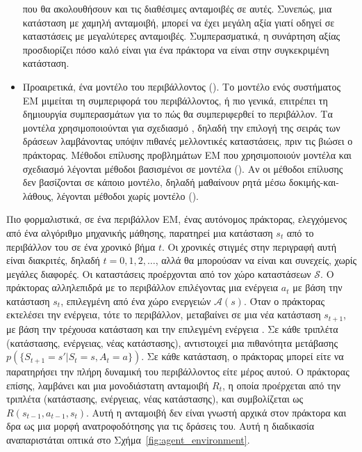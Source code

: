 \begin{itemize}
          που θα ακολουθήσουν και τις διαθέσιμες ανταμοιβές σε αυτές. Συνεπώς, μια κατάσταση
          με χαμηλή ανταμοιβή, μπορεί να έχει μεγάλη αξία γιατί οδηγεί σε καταστάσεις με μεγαλύτερες ανταμοιβές.
          Συμπερασματικά, η συνάρτηση αξίας προσδιορίζει πόσο καλό είναι για ένα πράκτορα να είναι στην συγκεκριμένη κατάσταση.
    \item Προαιρετικά, ένα μοντέλο του περιβάλλοντος (). Το μοντέλο ενός συστήματος ΕΜ μιμείται τη
          συμπεριφορά του περιβάλλοντος, ή πιο γενικά, επιτρέπει τη δημιουργία συμπερασμάτων για το πώς θα
          συμπεριφερθεί το περιβάλλον. Τα μοντέλα χρησιμοποιούνται για σχεδιασμό , δηλαδή την επιλογή της
          σειράς των δράσεων λαμβάνοντας υπόψιν πιθανές μελλοντικές καταστάσεις, πριν τις βιώσει ο πράκτορας.
          Μέθοδοι επίλυσης προβλημάτων ΕΜ που χρησιμοποιούν μοντέλα και σχεδιασμό λέγονται μέθοδοι βασισμένοι
          σε μοντέλα (). Αν οι μέθοδοι επίλυσης δεν βασίζονται σε κάποιο μοντέλο, δηλαδή μαθαίνουν ρητά μέσω
          δοκιμής-και-λάθους, λέγονται μέθοδοι χωρίς μοντέλο ().
\end{itemize}

Πιο φορμαλιστικά, σε ένα περιβάλλον ΕΜ, ένας αυτόνομος πράκτορας, ελεγχόμενος από ένα αλγόριθμο μηχανικής μάθησης,
παρατηρεί μια κατάσταση $s_t$ από το περιβάλλον του σε ένα χρονικό βήμα $t$. Οι χρονικές στιγμές στην περιγραφή αυτή είναι διακριτές,
δηλαδή $t=0,1,2,\ldots$, αλλά θα μπορούσαν να είναι και συνεχείς, χωρίς μεγάλες διαφορές. Οι καταστάσεις προέρχονται από τον
χώρο καταστάσεων $\mathcal{S}$. Ο πράκτορας αλληλεπιδρά με το περιβάλλον επιλέγοντας μια ενέργεια $a_t$ με βάση την κατάσταση
$s_t$, επιλεγμένη από ένα χώρο ενεργειών $\mathcal{A}(s)$. Όταν ο πράκτορας εκτελέσει την ενέργεια, τότε το περιβάλλον,
μεταβαίνει σε μια νέα κατάσταση $s_{t+1}$, με βάση την τρέχουσα κατάσταση και την επιλεγμένη
ενέργεια \cite{drlbs}. Σε κάθε τριπλέτα (κατάστασης, ενέργειας, νέας κατάστασης), αντιστοιχεί μια πιθανότητα μετάβασης
$p(\{S_{t+1}=s'|S_t=s, A_{t}=a\})$. Σε κάθε κατάσταση, ο πράκτορας μπορεί είτε να παρατηρήσει την πλήρη δυναμική του
περιβάλλοντος είτε μέρος αυτού. Ο πράκτορας επίσης, λαμβάνει και μια μονοδιάστατη ανταμοιβή $R_t$,
η οποία προέρχεται από την τριπλέτα (κατάστασης, ενέργειας, νέας κατάστασης), και συμβολίζεται ως
$R(s_{t-1}, a_{t-1}, s_t)$. Αυτή η ανταμοιβή δεν είναι γνωστή αρχικά στον πράκτορα και
δρα ως μια μορφή ανατροφοδότησης για τις δράσεις του.
Αυτή η διαδικασία αναπαριστάται οπτικά στο Σχήμα~\ref{fig:agent_environment}.


